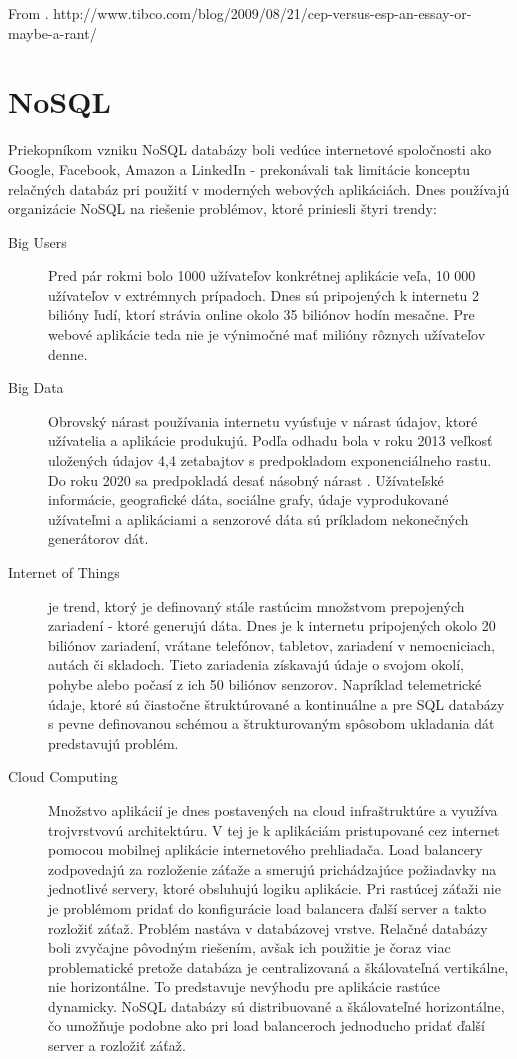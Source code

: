	
	From \cite{web:cep-editorial}.
	http://www.tibco.com/blog/2009/08/21/cep-versus-esp-an-essay-or-maybe-a-rant/

\section{NoSQL}
	Priekopníkom vzniku NoSQL databázy boli vedúce internetové spoločnosti ako Google, Facebook, Amazon a LinkedIn - prekonávali tak limitácie konceptu relačných databáz pri použití v moderných webových aplikáciách. Dnes používajú organizácie NoSQL na riešenie problémov, ktoré priniesli štyri trendy:
	\begin{description}
		\item[Big Users] Pred pár rokmi bolo 1000 užívateľov konkrétnej aplikácie veľa, 10 000 užívateľov v extrémnych prípadoch. Dnes sú pripojených k internetu 2 bilióny ľudí, ktorí strávia online okolo 35 biliónov hodín mesačne. Pre webové aplikácie teda nie je výnimočné mať milióny rôznych užívateľov denne.
		
		\item[Big Data] Obrovský nárast používania internetu vyúsťuje v nárast údajov, ktoré užívatelia a aplikácie produkujú. Podľa odhadu bola v roku 2013 veľkosť uložených údajov 4,4 zetabajtov s predpokladom exponenciálneho rastu. Do roku 2020 sa predpokladá desať násobný nárast \cite{web:idc-bigdata}. Užívateľské informácie, geografické dáta, sociálne grafy, údaje vyprodukované užívateľmi a aplikáciami a senzorové dáta sú príkladom nekonečných generátorov dát.
		
		\item[Internet of Things] je trend, ktorý je definovaný stále rastúcim množstvom prepojených zariadení - ktoré generujú dáta. Dnes je k internetu pripojených okolo 20 biliónov zariadení, vrátane telefónov, tabletov, zariadení v nemocniciach, autách či skladoch. Tieto zariadenia získavajú údaje o svojom okolí, pohybe alebo počasí z ich 50 biliónov senzorov.
		Napríklad telemetrické údaje, ktoré sú čiastočne štruktúrované a kontinuálne a pre SQL databázy s pevne definovanou schémou a štrukturovaným spôsobom ukladania dát predstavujú problém.
		
		\item[Cloud Computing] Množstvo aplikácií je dnes postavených na cloud infraštruktúre a využíva trojvrstvovú architektúru. V tej je k aplikáciám pristupované cez internet pomocou mobilnej aplikácie internetového prehliadača. Load balancery zodpovedajú za rozloženie záťaže a smerujú prichádzajúce požiadavky na jednotlivé servery, ktoré obsluhujú logiku aplikácie. Pri rastúcej záťaži nie je problémom pridať do konfigurácie load balancera ďalší server a takto rozložiť záťaž.
		Problém nastáva v databázovej vrstve. Relačné databázy boli zvyčajne pôvodným riešením, avšak ich použitie je čoraz viac problematické pretože databáza je centralizovaná a škálovateľná vertikálne, nie horizontálne. To predstavuje nevýhodu pre aplikácie rastúce dynamicky. NoSQL databázy sú distribuované a škálovateľné horizontálne, čo umožňuje podobne ako pri load balanceroch jednoducho pridať ďalší server a rozložiť záťaž.
	\end{description}
	
